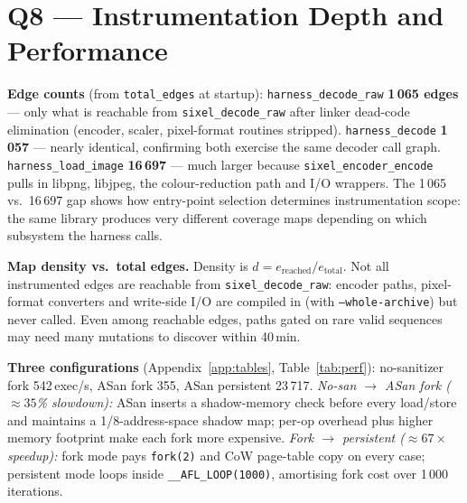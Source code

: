 \documentclass[letterpaper,twocolumn,10pt]{article}
\begin{document}
\section{Q8 --- Instrumentation Depth and Performance}

\textbf{Edge counts} (from \texttt{total\_edges} at startup):
\texttt{harness\_decode\_raw} \textbf{1\,065 edges} --- only what is reachable
from \texttt{sixel\_decode\_raw} after linker dead-code elimination (encoder,
scaler, pixel-format routines stripped). \texttt{harness\_decode}
\textbf{1\,057} --- nearly identical, confirming both exercise the same decoder
call graph. \texttt{harness\_load\_image} \textbf{16\,697} --- much larger
because \texttt{sixel\_encoder\_encode} pulls in libpng, libjpeg, the
colour-reduction path and I/O wrappers. The 1\,065 vs.\ 16\,697 gap shows how
entry-point selection determines instrumentation scope: the same library
produces very different coverage maps depending on which subsystem the harness
calls.

\textbf{Map density vs.\ total edges.} Density is
$d = e_{\text{reached}}/e_{\text{total}}$. Not all instrumented edges are
reachable from \texttt{sixel\_decode\_raw}: encoder paths, pixel-format
converters and write-side I/O are compiled in (with \texttt{--whole-archive})
but never called. Even among reachable edges, paths gated on rare valid
sequences may need many mutations to discover within 40\,min.

\textbf{Three configurations} (Appendix~\ref{app:tables}, Table~\ref{tab:perf}):
no-sanitizer fork 542\,exec/s, ASan fork 355, ASan persistent 23\,717.
\emph{No-san $\to$ ASan fork ($\approx 35$\% slowdown):} ASan inserts a
shadow-memory check before every load/store and maintains a 1/8-address-space
shadow map; per-op overhead plus higher memory footprint make each fork more
expensive. \emph{Fork $\to$ persistent ($\approx 67\times$ speedup):} fork mode
pays \texttt{fork(2)} and CoW page-table copy on every case; persistent mode
loops inside \texttt{\_\_AFL\_LOOP(1000)}, amortising fork cost over 1\,000
iterations.

\appendix

\setlength{\intextsep}{2pt plus 1pt minus 1pt}
\setlength{\textfloatsep}{4pt plus 1pt minus 1pt}
\setlength{\floatsep}{4pt plus 1pt minus 1pt}
\setlength{\abovecaptionskip}{3pt}
\setlength{\belowcaptionskip}{0pt}
\end{document}
